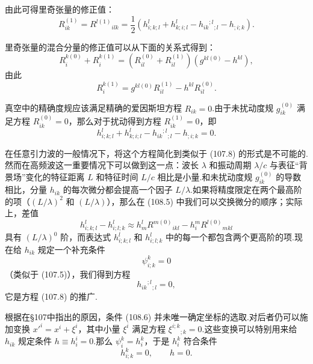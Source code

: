 由此可得里奇张量的修正值：
\begin{equation}
  R_{ik}^{(1)}=R^{l(1)}{}_{ilk}
  =\frac{1}{2}\left(h_{i;k;l}^{l}+h_{k;i;l}^{l}
  -h_{ik}{}^{;l}{}_{;l}-h_{;i;k}\right).
\end{equation}

里奇张量的混合分量的修正值可以从下面的关系式得到：
\begin{equation*}
  R_i^{k(0)}+R_i^{k(1)}
  =(R_{il}^{(0)}+R_{il}^{(1)})(g^{kl(0)}-h^{kl}),
\end{equation*}
由此
\begin{equation}
  R_i^{k(1)}=g^{kl(0)}R_{il}^{(1)}-h^{kl}R_{il}^{(0)}.
\end{equation}

真空中的精确度规应该满足精确的爱因斯坦方程 $R_{ik}=0$.由于未扰动度规 $g_{ik}^{(0)}$ 满足方程 $R_{ik}^{(0)}=0$，那么对于扰动得到方程 $R_{ik}^{(1)}=0$，即
\begin{equation}
  h_{i;k;l}^{l}+h_{k;i;l}^{l}
  -h_{ik}{}^{;l}{}_{;l}-h_{;i;k}=0.
\end{equation}

在任意引力波的一般情况下，将这个方程简化到类似于 (107.8) 的形式是不可能的.然而在高频波这一重要情况下可以做到这一点：波长 $\lambda$ 和振动周期 $\lambda/c$ 与表征“背景场”变化的特征距离 $L$ 和特征时间 $L/c$ 相比是小量.和未扰动度规 $g_{ik}^{(0)}$ 的导数相比，分量 $h_{ik}$ 的每次微分都会提高一个因子 $L/\lambda$.如果将精度限定在两个最高阶的项（$(L/\lambda)^{2}$ 和 $(L/\lambda)$），那么在 (108.5) 中我们可以交换微分的顺序；实际上，差值
\begin{equation*}
  h_{i;k;l}^{l}-h_{i;l;k}^{l}
  \approx h_m^lR^{m(0)}{}_{ikl}
  -h_i^mR^{l(0)}{}_{mkl}
\end{equation*}
具有 $(L/\lambda)^{0}$ 阶，而表达式 $h_{i;k;l}^{l}$ 和 $h_{i;l;k}^{l}$ 中的每一个都包含两个更高阶的项.现在给 $h_{ik}$ 规定一个补充条件
\begin{equation}
  \psi_{i;k}^{k}=0
\end{equation}
（类似于 (107.5)），我们得到方程
\begin{equation}
  h_{ik}{}^{;l}{}_{;l}=0,
\end{equation}
它是方程 (107.8) 的推广.

根据在§107中指出的原因，条件 (108.6) 并未唯一确定坐标的选取.对后者仍可以施加变换 $x'^i=x^i+\xi^i$，其中小量 $\xi^i$ 满足方程 $\xi^{i;k}{}_{;k}=0$.这些变换可以特别用来给 $h_{ik}$ 规定条件 $h\equiv h_i^i=0$.那么 $\psi_i^k=h_i^k$，于是 $h_i^k$ 符合条件
\begin{equation}
  h_{i;k}^{k}=0,\qquad h=0.
\end{equation}

